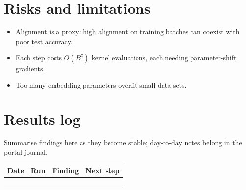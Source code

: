 \documentclass[11pt,a4paper]{article}
\begin{document}
\section{Risks and limitations}
\begin{itemize}
  \item Alignment is a proxy: high alignment on training batches can coexist with poor test accuracy.
  \item Each step costs $O(B^2)$ kernel evaluations, each needing parameter-shift gradients.
  \item Too many embedding parameters overfit small data sets.
\end{itemize}

\section{Results log}
\label{sec:log}
Summarise findings here as they become stable; day-to-day notes belong in the portal journal.

\begin{table}[h]
\centering\small
\begin{tabularx}{\linewidth}{@{}l l >{\raggedright}X >{\raggedright\arraybackslash}X@{}}
\toprule
Date & Run & Finding & Next step \\
\midrule
 & & & \\
 & & & \\
 & & & \\
\bottomrule
\end{tabularx}
\end{table}



\end{document}

